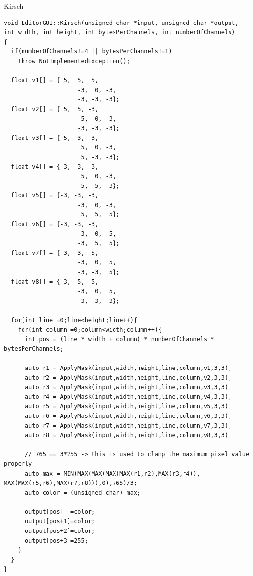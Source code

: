 \documentclass[a4paper]{sbgames}               %
\begin{document}
\pagebreak
Kirsch
\begin{lstlisting}[basicstyle=\scriptsize\ttfamily,]
void EditorGUI::Kirsch(unsigned char *input, unsigned char *output, int width, int height, int bytesPerChannels, int numberOfChannels)
{
  if(numberOfChannels!=4 || bytesPerChannels!=1)
    throw NotImplementedException();

  float v1[] = { 5,  5,  5,
                     -3,  0, -3,
                     -3, -3, -3};
  float v2[] = { 5,  5, -3,
                      5,  0, -3,
                     -3, -3, -3};
  float v3[] = { 5, -3, -3,
                      5,  0, -3,
                      5, -3, -3};
  float v4[] = {-3, -3, -3,
                      5,  0, -3,
                      5,  5, -3};
  float v5[] = {-3, -3, -3,
                     -3,  0, -3,
                      5,  5,  5};
  float v6[] = {-3, -3, -3,
                     -3,  0,  5,
                     -3,  5,  5};
  float v7[] = {-3, -3,  5,
                     -3,  0,  5,
                     -3, -3,  5};
  float v8[] = {-3,  5,  5,
                     -3,  0,  5,
                     -3, -3, -3};

  for(int line =0;line<height;line++){
    for(int column =0;column<width;column++){
      int pos = (line * width + column) * numberOfChannels * bytesPerChannels;

      auto r1 = ApplyMask(input,width,height,line,column,v1,3,3);
      auto r2 = ApplyMask(input,width,height,line,column,v2,3,3);
      auto r3 = ApplyMask(input,width,height,line,column,v3,3,3);
      auto r4 = ApplyMask(input,width,height,line,column,v4,3,3);
      auto r5 = ApplyMask(input,width,height,line,column,v5,3,3);
      auto r6 = ApplyMask(input,width,height,line,column,v6,3,3);
      auto r7 = ApplyMask(input,width,height,line,column,v7,3,3);
      auto r8 = ApplyMask(input,width,height,line,column,v8,3,3);

      // 765 == 3*255 -> this is used to clamp the maximum pixel value properly
      auto max = MIN(MAX(MAX(MAX(MAX(r1,r2),MAX(r3,r4)), MAX(MAX(r5,r6),MAX(r7,r8))),0),765)/3;
      auto color = (unsigned char) max;

      output[pos]  =color;
      output[pos+1]=color;
      output[pos+2]=color;
      output[pos+3]=255;
    }
  }
}
\end{lstlisting}
\pagebreak
\end{document}
